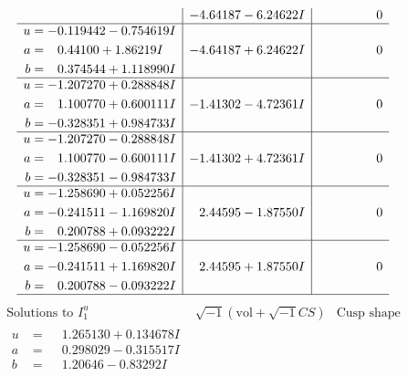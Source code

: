 \documentclass[1p]{elsarticle_modified}
\theoremstyle{definition}
\newcommand{\I}{\sqrt{-1}}
\begin{document}
$$\begin{array}{c|c|c}
 & -4.64187 - 6.24622 I & \phantom{-0.000000 } 0 \\ \hline\begin{aligned}
u &= -0.119442 - 0.754619 I \\
a &= \phantom{-}0.44100 + 1.86219 I \\
b &= \phantom{-}0.374544 + 1.118990 I\end{aligned}
 & -4.64187 + 6.24622 I & \phantom{-0.000000 } 0 \\ \hline\begin{aligned}
u &= -1.207270 + 0.288848 I \\
a &= \phantom{-}1.100770 + 0.600111 I \\
b &= -0.328351 + 0.984733 I\end{aligned}
 & -1.41302 - 4.72361 I & \phantom{-0.000000 } 0 \\ \hline\begin{aligned}
u &= -1.207270 - 0.288848 I \\
a &= \phantom{-}1.100770 - 0.600111 I \\
b &= -0.328351 - 0.984733 I\end{aligned}
 & -1.41302 + 4.72361 I & \phantom{-0.000000 } 0 \\ \hline\begin{aligned}
u &= -1.258690 + 0.052256 I \\
a &= -0.241511 - 1.169820 I \\
b &= \phantom{-}0.200788 + 0.093222 I\end{aligned}
 & \phantom{-}2.44595 - 1.87550 I & \phantom{-0.000000 } 0 \\ \hline\begin{aligned}
u &= -1.258690 - 0.052256 I \\
a &= -0.241511 + 1.169820 I \\
b &= \phantom{-}0.200788 - 0.093222 I\end{aligned}
 & \phantom{-}2.44595 + 1.87550 I & \phantom{-0.000000 } 0\\
 \hline 
 \end{array}$$\newpage$$\begin{array}{c|c|c}  
\text{Solutions to }I^u_{1}& \I (\text{vol} + \sqrt{-1}CS) & \text{Cusp shape}\\
 \hline 
\begin{aligned}
u &= \phantom{-}1.265130 + 0.134678 I \\
a &= \phantom{-}0.298029 - 0.315517 I \\
b &= \phantom{-}1.20646 - 0.83292 I\end{aligned}

\end{array}$$
\end{document}
